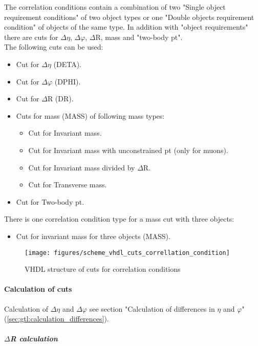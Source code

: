 The correlation conditions contain a combination of two "Single object requirement conditions" of two object types or one "Double objects requirement condition" of objects of the same type. In addition with "object requirements" there are cuts for $\Delta\eta$, $\Delta\varphi$, $\Delta$R, mass and "two-body pt".\\

The following cuts can be used:
\begin{itemize}
\item Cut for $\Delta\eta$ (DETA).
\item Cut for $\Delta\varphi$ (DPHI).
\item Cut for $\Delta$R (DR).
\item Cuts for mass (MASS) of following mass types:
  \begin{itemize}
  \item Cut for Invariant mass.
  \item Cut for Invariant mass with unconstrained pt (only for muons).
  \item Cut for Invariant mass divided by $\Delta$R.
  \item Cut for Transverse mass.
  \end{itemize}
\item Cut for Two-body pt.
\end{itemize}

There is one correlation condition type for a mass cut with three objects:
\begin{itemize}
\item Cut for invariant mass for three objects (MASS).
\end{itemize}

\begin{figure}[htb]
\centering
\texttt{[image: figures/scheme\_vhdl\_cuts\_correllation\_condition]}
\caption{VHDL structure of cuts for correlation conditions} 
\label{fig:gtl:scheme_vhdl_cuts_correllation_condition}
\end{figure}

\paragraph{Calculation of cuts}
\label{sec:gtl:delta_r_calculation}

Calculation of $\Delta\eta$ and $\Delta\varphi$ see section "Calculation of differences in $\eta$ and $\varphi$" (\ref{sec:gtl:calculation_differences}).

\subparagraph{$\Delta$R calculation}
\label{sec:gtl:delta_r_calculation}

